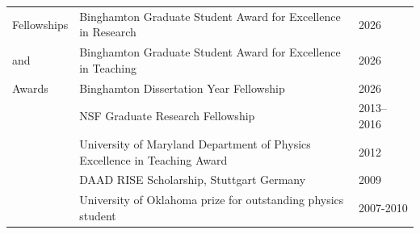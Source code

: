 \documentclass[letterpaper,12pt,oneside]{article}
\begin{document}
\begin{longtable}{p{0.15\linewidth}p{0.7\linewidth}p{0.15\linewidth}}
\large{Fellowships} & Binghamton Graduate Student Award for Excellence in Research & 2026 \\
  \large{and} & Binghamton Graduate Student Award for Excellence in Teaching & 2026 \\
\large{Awards} & Binghamton Dissertation Year Fellowship & 2026 \\
  & NSF Graduate Research Fellowship & 2013--2016 \\
  & University of Maryland Department of Physics Excellence in Teaching Award & 2012 \\
  & DAAD RISE Scholarship, Stuttgart Germany & 2009 \\
     & University of Oklahoma prize for outstanding physics student & 2007-2010 
\end{longtable}
\end{document}
